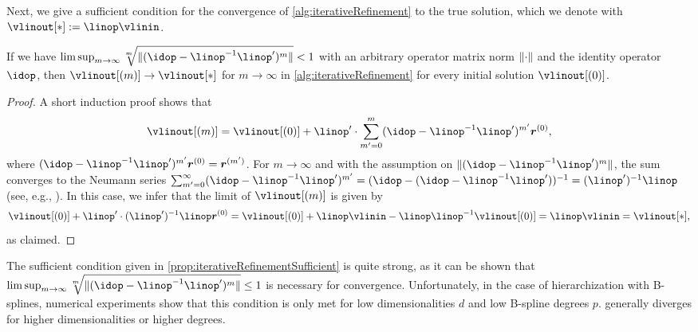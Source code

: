Next, we give a sufficient condition for the
convergence of \cref{alg:iterativeRefinement} to the true
solution, which we denote with $\vlinout[\ast] := \linop \vlinin$.

\begin{proposition}
  \label{prop:iterativeRefinementSufficient}
  If we have $\limsup_{m \to \infty}
  \sqrt[m]{\norm{(\idop - \linop^{-1} \linop')^m}} < 1$
  with an arbitrary operator matrix norm $\norm{\cdot}$ and the
  identity operator $\idop$,
  then $\vlinout[(m)] \to \vlinout[\ast]$ for $m \to \infty$
  in \cref{alg:iterativeRefinement}
  for every initial solution $\vlinout[(0)]$.
\end{proposition}

\begin{proof}
  A short induction proof shows that
  \begin{equation}
    \label{eq:proofPropIterativeRefinementSufficient}
    \vlinout[(m)]
    = \vlinout[(0)] + \linop' \cdot
    \sum_{m'=0}^m (\idop - \linop^{-1} \linop')^{m'} \*r^{(0)},
  \end{equation}
  where $(\idop - \linop^{-1} \linop')^{m'} \*r^{(0)} = \*r^{(m')}$.
  For $m \to \infty$ and with the assumption on
  $\norm{(\idop - \linop^{-1} \linop')^m}$,
  the sum converges to the Neumann series
  $\sum_{m'=0}^\infty (\idop - \linop^{-1} \linop')^{m'}
  = (\idop - (\idop - \linop^{-1} \linop'))^{-1} = (\linop')^{-1} \linop$
  (see, e.g., \cite{Werner11Funktionalanalysis}).
  In this case, we infer that the limit of $\vlinout[(m)]$ is given by
  \begin{equation}
    \vlinout[(0)] + \linop' \cdot (\linop')^{-1} \linop \*r^{(0)}
    = \vlinout[(0)] + \linop \vlinin - \linop \linop^{-1} \vlinout[(0)]
    = \linop \vlinin
    = \vlinout[\ast],
  \end{equation}
  as claimed.
\end{proof}

The sufficient condition given in \cref{prop:iterativeRefinementSufficient}
is quite strong, as it can be shown that $\limsup_{m \to \infty}
\sqrt[m]{\norm{(\idop - \linop^{-1} \linop')^m}} \le 1$ is necessary for
convergence.
Unfortunately, in the case of hierarchization with B-splines,
numerical experiments show that
this condition is only met for low dimensionalities $d$ and low
B-spline degrees $p$.
 generally diverges
for higher dimensionalities or higher degrees.




